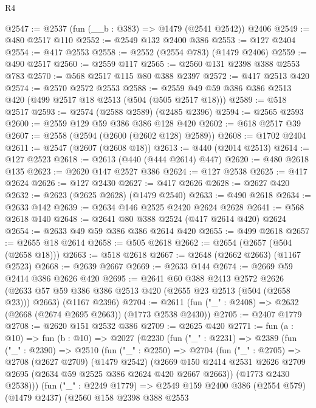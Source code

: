 \begin{lexlean}{R4}
\begin{coremodule}
@2547 := @2537 (fun (__b : @383) => @1479 (@2541 @2542)) @2406
@2549 := @480 @2517 @110
@2552 := @2549 @132 @2400 @386
@2553 := @127 @2404
@2554 := @417 @2553
@2558 := @2552 (@2554 @783) (@1479 @2406)
@2559 := @490 @2517
@2560 := @2559 @117
@2565 := @2560 @131 @2398 @388 @2553 @783
@2570 := @568 @2517 @115 @80 @388 @2397
@2572 := @417 @2513 @420
@2574 := @2570 @2572 @2553
@2588 := @2559 @49 @59 @386 @386 @2513 @420 (@499 @2517 @18 @2513 (@504 (@505 @2517 @18)))
@2589 := @518 @2517
@2593 := @2574 (@2588 @2589) (@2485 @2396)
@2594 := @2565 @2593
@2600 := @2559 @129 @59 @386 @386 @128 @420
@2602 := @618 @2517 @39
@2607 := @2558 (@2594 (@2600 (@2602 @128) @2589))
@2608 := @1702 @2404
@2611 := @2547 (@2607 (@2608 @18))
@2613 := @440 (@2014 @2513)
@2614 := @127 @2523
@2618 := @2613 (@440 (@444 @2614) @447)
@2620 := @480 @2618 @135
@2623 := @2620 @147 @2527 @386
@2624 := @127 @2538
@2625 := @417 @2624
@2626 := @127 @2430
@2627 := @417 @2626
@2628 := @2627 @420
@2632 := @2623 (@2625 @2628) (@1479 @2540)
@2633 := @490 @2618
@2634 := @2633 @142
@2639 := @2634 @146 @2525 @2420 @2624 @2628
@2641 := @568 @2618 @140
@2648 := @2641 @80 @388 @2524 (@417 @2614 @420) @2624
@2654 := @2633 @49 @59 @386 @386 @2614 @420
@2655 := @499 @2618
@2657 := @2655 @18 @2614
@2658 := @505 @2618
@2662 := @2654 (@2657 (@504 (@2658 @18)))
@2663 := @518 @2618
@2667 := @2648 (@2662 @2663) (@1167 @2523)
@2668 := @2639 @2667
@2669 := @2633 @144
@2674 := @2669 @59 @2414 @386 @2626 @420
@2695 := @2641
    @60
    @388
    @2413
    @2572
    @2626
    (@2633 @57 @59 @386 @386 @2513 @420 (@2655 @23 @2513 (@504 (@2658 @23))) @2663)
    (@1167 @2396)
@2704 := @2611 (fun ("_" : @2408) => @2632 (@2668 (@2674 @2695 @2663)) (@1773 @2538 @2430))
@2705 := @2407 @1779
@2708 := @2620 @151 @2532 @386
@2709 := @2625 @420
@2771 := fun (a : @10) =>
  fun (b : @10) =>
  @2027
    (@2230
      (fun ("_" : @2231) =>
      @2389
        (fun ("_" : @2390) =>
        @2510
          (fun ("_" : @2250) =>
          @2704
            (fun ("_" : @2705) =>
            @2708
              (@2627 @2709)
              (@1479 @2542)
              (@2669
                @150
                @2414
                @2531
                @2626
                @2709
                @2695
                (@2634 @59 @2525 @386 @2624 @420 @2667 @2663))
              (@1773 @2430 @2538)))
          (fun ("_" : @2249 @1779) =>
          @2549
            @159
            @2400
            @386
            (@2554 @579)
            (@1479 @2437)
            (@2560
              @158
              @2398
              @388
              @2553

\end{coremodule}
\end{lexlean}
